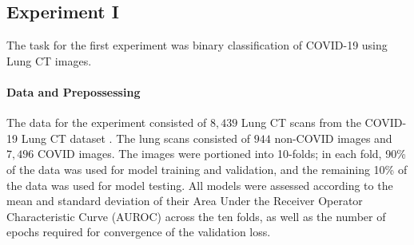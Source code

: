 \documentclass[conference]{IEEEtran}
\begin{document}
\subsection{Experiment I}\label{sec:Exp1}
The task for the first experiment was binary classification of COVID-19 using Lung CT images. 

\paragraph*{Data and Prepossessing} The data for the experiment consisted of $8,439$ Lung CT scans from the COVID-19 Lung CT dataset \cite{covid19binary}. The lung scans consisted of $944$ non-COVID images and $7,496$ COVID images. The images were portioned into 10-folds; in each fold, 90\% of the data was used for model training and validation, and the remaining 10\% of the data was used for model testing. All models were assessed according to the mean and standard deviation of their Area Under the Receiver Operator Characteristic Curve (AUROC) across the ten folds, as well as the number of epochs required for convergence of the validation loss.

\begin{table}[!b]
\centering
\small
\caption{Comparison of the AUROC (mean and standard deviation) as well as the average epochs until convergence for our proposed approach (FINs), and the three baseline approaches (SVM, DFNN, CNN) across the 10-folds in experiment I.}

\label{table:exp1}
\end{table}
\end{document}
